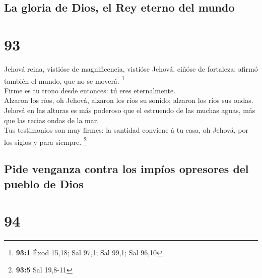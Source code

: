 \hypertarget{la-gloria-de-dios-el-rey-eterno-del-mundo}{%
\subsection{La gloria de Dios, el Rey eterno del
mundo}\label{la-gloria-de-dios-el-rey-eterno-del-mundo}}

\hypertarget{section-92}{%
\section{93}\label{section-92}}

 Jehová reina, vistióse de magnificencia, vistióse Jehová,
ciñóse de fortaleza; afirmó también el mundo, que no se moverá.
\footnote{\textbf{93:1} Éxod 15,18; Sal 97,1; Sal 99,1; Sal 96,10}\\
 Firme es tu trono desde entonces: tú eres eternalmente.\\
 Alzaron los ríos, oh Jehová, alzaron los ríos su sonido;
alzaron los ríos sus ondas.\\
 Jehová en las alturas es más poderoso que el estruendo de
las muchas aguas, más que las recias ondas de la mar.\\
 Tus testimonios son muy firmes: la santidad conviene á tu
casa, oh Jehová, por los siglos y para siempre. \footnote{\textbf{93:5}
  Sal 19,8-11}

\hypertarget{pide-venganza-contra-los-impuxedos-opresores-del-pueblo-de-dios}{%
\subsection{Pide venganza contra los impíos opresores del pueblo de
Dios}\label{pide-venganza-contra-los-impuxedos-opresores-del-pueblo-de-dios}}

\hypertarget{section-93}{%
\section{94}\label{section-93}}

